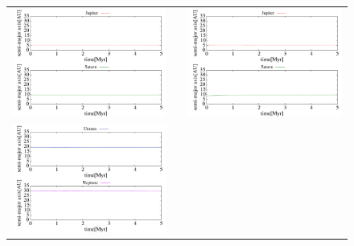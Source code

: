 \documentclass[11pt,a4paper,oneside,onecolumn]{jreport}
\begin{document}
\begin{figure}[H]
\begin{tabular}{ccc}
\begin{minipage}[t]{0.45\hsize}
\centering
\includegraphics[width=8cm]{./image/NoMove_axis_5Myr_JUPSAT.pdf}
\end{minipage} &
\begin{minipage}[t]{0.1\hsize}
\end{minipage} &
\begin{minipage}[t]{0.45\hsize}
\centering
\includegraphics[width=8cm]{./image/Move500kyr_axis_5Myr_JUPSAT.pdf}
\end{minipage}\\
\begin{minipage}[t]{0.45\hsize}
\centering
\includegraphics[width=8cm]{./image/NoMove_axis_5Myr_URANEP.pdf}
\end{minipage} &

\end{tabular}
\end{figure}
\end{document}
